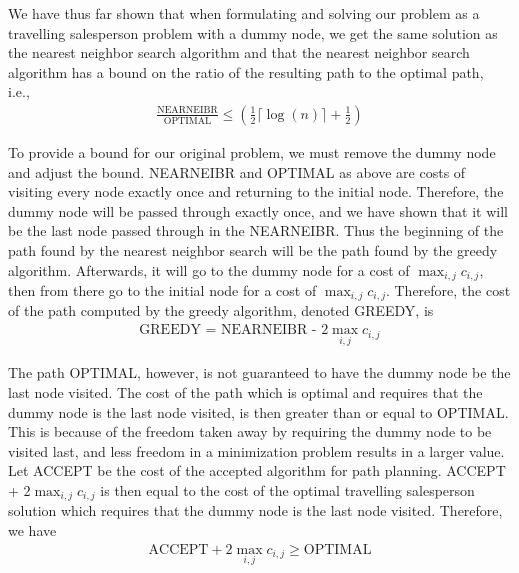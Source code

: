 We have thus far shown that when formulating and solving our problem as a travelling salesperson problem with a dummy node, we get the same solution as the nearest neighbor search algorithm and that the nearest neighbor search algorithm has a bound on the ratio of the resulting path to the optimal path, i.e.,\ 
\begin{align*}
\frac{\text{NEARNEIBR}}{\text{OPTIMAL}} \leq (\frac{1}{2} \lceil \log(n) \rceil + \frac{1}{2}) 
\end{align*}

To provide a bound for our original problem, we must remove the dummy node and adjust the bound. NEARNEIBR and OPTIMAL as above are costs of visiting every node exactly once and returning to the initial node. Therefore, the dummy node will be passed through exactly once, and we have shown that it will be the last node passed through in the NEARNEIBR. Thus the beginning of the path found by the nearest neighbor search will be the path found by the greedy algorithm. Afterwards, it will go to the dummy node for a cost of $\max_{i,j} c_{i,j}$, then from there go to the initial node for a cost of $\max_{i,j} c_{i,j}$. Therefore, the cost of the path computed by the greedy algorithm, denoted GREEDY, is 
\begin{align*}
\text{GREEDY = NEARNEIBR - } 2\max_{i,j} c_{i,j} 
\end{align*}

The path OPTIMAL, however, is not guaranteed to have the dummy node be the last node visited. The cost of the path which is optimal and requires that the dummy node is the last node visited, is then greater than or equal to OPTIMAL. This is because of the freedom taken away by requiring the dummy node to be visited last, and less freedom in a minimization problem results in a larger value. Let ACCEPT be the cost of the accepted algorithm for path planning. ACCEPT + $2\max_{i,j} c_{i,j}$ is then equal to the cost of the optimal travelling salesperson solution which requires that the dummy node is the last node visited. Therefore, we have
\begin{align*}
\text{ACCEPT} + 2\max_{i,j} c_{i,j} \geq \text{OPTIMAL}
\end{align*}

